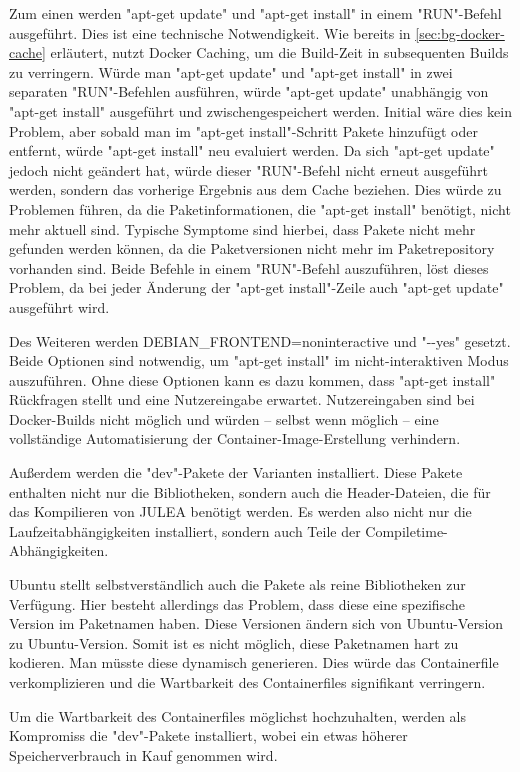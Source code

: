 Zum einen werden "apt-get update" und "apt-get install" in einem "RUN"-Befehl ausgeführt. Dies ist eine technische Notwendigkeit. Wie bereits in \cref{sec:bg-docker-cache} erläutert, nutzt Docker Caching, um die Build-Zeit in subsequenten Builds zu verringern. Würde man "apt-get update" und "apt-get install" in zwei separaten "RUN"-Befehlen ausführen, würde "apt-get update" unabhängig von "apt-get install" ausgeführt und zwischengespeichert werden. Initial wäre dies kein Problem, aber sobald man im "apt-get install"-Schritt Pakete hinzufügt oder entfernt, würde "apt-get install" neu evaluiert werden. Da sich "apt-get update" jedoch nicht geändert hat, würde dieser "RUN"-Befehl nicht erneut ausgeführt werden, sondern das vorherige Ergebnis aus dem Cache beziehen. Dies würde zu Problemen führen, da die Paketinformationen, die "apt-get install" benötigt, nicht mehr aktuell sind. Typische Symptome sind hierbei, dass Pakete nicht mehr gefunden werden können, da die Paketversionen nicht mehr im Paketrepository vorhanden sind. Beide Befehle in einem "RUN"-Befehl auszuführen, löst dieses Problem, da bei jeder Änderung der "apt-get install"-Zeile auch "apt-get update" ausgeführt wird.

Des Weiteren werden DEBIAN\_FRONTEND=noninteractive und "\hyphen{}\hyphen{}yes" gesetzt. Beide Optionen sind notwendig, um "apt-get install" im nicht-interaktiven Modus auszuführen. Ohne diese Optionen kann es dazu kommen, dass "apt-get install" Rückfragen stellt und eine Nutzereingabe erwartet. Nutzereingaben sind bei Docker-Builds nicht möglich und würden – selbst wenn möglich – eine vollständige Automatisierung der Container-Image-Erstellung verhindern.

Außerdem werden die "dev"-Pakete der Varianten installiert. Diese Pakete enthalten nicht nur die Bibliotheken, sondern auch die Header-Dateien, die für das Kompilieren von JULEA benötigt werden. Es werden also nicht nur die Laufzeitabhängigkeiten installiert, sondern auch Teile der Compiletime-Abhängigkeiten.

Ubuntu stellt selbstverständlich auch die Pakete als reine Bibliotheken zur Verfügung. Hier besteht allerdings das Problem, dass diese eine spezifische Version im Paketnamen haben. Diese Versionen ändern sich von Ubuntu-Version zu Ubuntu-Version. Somit ist es nicht möglich, diese Paketnamen hart zu kodieren. Man müsste diese dynamisch generieren. Dies würde das Containerfile verkomplizieren und die Wartbarkeit des Containerfiles signifikant verringern.

Um die Wartbarkeit des Containerfiles möglichst hochzuhalten, werden als Kompromiss die "dev"-Pakete installiert, wobei ein etwas höherer Speicherverbrauch in Kauf genommen wird.

